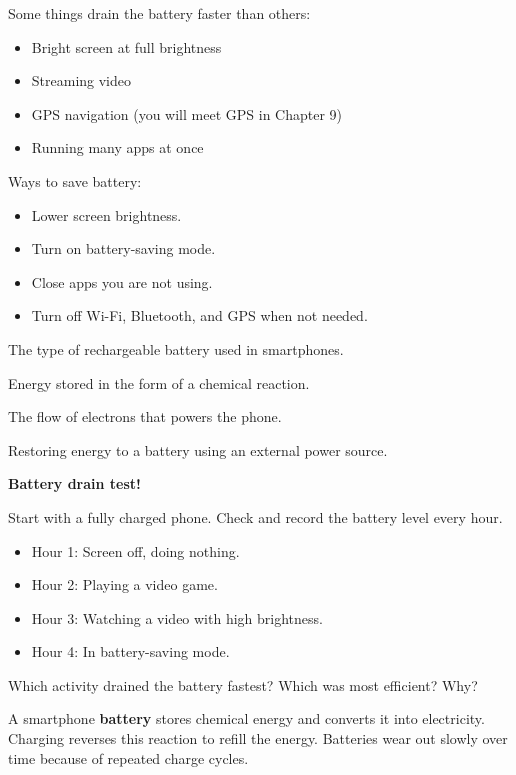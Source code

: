 Some things drain the battery faster than others:
\begin{itemize}
  \item Bright screen at full brightness
  \item Streaming video
  \item GPS navigation (you will meet GPS in Chapter 9)
  \item Running many apps at once
\end{itemize}

Ways to save battery:
\begin{itemize}
  \item Lower screen brightness.
  \item Turn on battery-saving mode.
  \item Close apps you are not using.
  \item Turn off Wi-Fi, Bluetooth, and GPS when not needed.
\end{itemize}

\sectionrule

\begin{newwords}
  \begin{description}[labelwidth=4cm, leftmargin=4.2cm]
    \item[\term{Lithium-ion battery}] The type of rechargeable battery used in smartphones.
    \item[\term{Chemical energy}]     Energy stored in the form of a chemical reaction.
    \item[\term{Electric current}]    The flow of electrons that powers the phone.
    \item[\term{Charging}]            Restoring energy to a battery using an external power source.
  \end{description}
\end{newwords}

\sectionrule

\begin{experiment}
  \textbf{Battery drain test!}

  Start with a fully charged phone. Check and record the battery level every hour.
  \begin{itemize}
    \item Hour 1: Screen off, doing nothing.
    \item Hour 2: Playing a video game.
    \item Hour 3: Watching a video with high brightness.
    \item Hour 4: In battery-saving mode.
  \end{itemize}
  Which activity drained the battery fastest? Which was most efficient? Why?
\end{experiment}

\sectionrule

\begin{bigidea}
  A smartphone \textbf{battery} stores chemical energy and converts it
  into electricity. Charging reverses this reaction to refill the energy.
  Batteries wear out slowly over time because of repeated charge cycles.
\end{bigidea}

